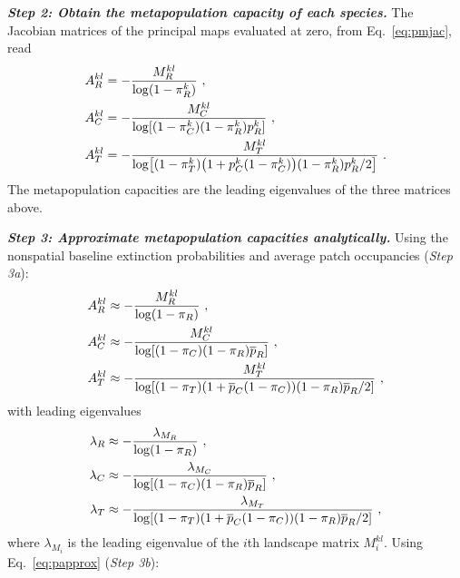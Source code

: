\documentclass[11pt]{article}
\newcommand{\ol}[1]{\overline{#1}}
\let\originalleft\left
\let\originalright\right
\renewcommand{\left}{\mathopen{}\mathclose\bgroup\originalleft}
\renewcommand{\right}{\aftergroup\egroup\originalright}
\begin{document}
\textit{\textbf{Step 2: Obtain the metapopulation capacity of each species.}}
The Jacobian matrices of the principal maps evaluated at zero, from Eq.~\ref{eq:pmjac}, read
\begin{align}
  \label{eq:BN_A_omniv_R}
  A_R^{kl} &= -\frac{M_R^{kl}}{\log(1 - \pi_R^k)} \ , \\
  \label{eq:BN_A_omniv_C}
  A_C^{kl} &= -\frac{M_C^{kl}}{\log[(1 - \pi_C^k) (1 - \pi_R^k) p_R^k]} \ , \\
  \label{eq:BN_A_omniv_T}
  A_T^{kl} &= -\frac{M_T^{kl}}{\log \left[ (1 - \pi_T^k) \left( 1 + p_C^k
             (1-\pi_C^k) \right) (1-\pi_R^k) p_R^k / 2 \right] } \ .
\end{align}
The metapopulation capacities are the leading eigenvalues of the three matrices above.

\textit{\textbf{Step 3: Approximate metapopulation capacities analytically.}}
Using the nonspatial baseline extinction probabilities and average patch occupancies (\textit{Step 3a}):
\begin{align}
  \label{eq:BN_A_omniv_R_nonspatial}
  A_R^{kl} &\approx -\frac{M_R^{kl}}{\log(1 - \pi_R)} \ , \\
  \label{eq:BN_A_omniv_C_nonspatial}
  A_C^{kl} &\approx -\frac{M_C^{kl}}{\log[(1 - \pi_C) (1-\pi_R)\ol{p}_R]} \ , \\
  \label{eq:BN_A_omniv_T_nonspatial}
  A_T^{kl} &\approx -\frac{M_T^{kl}}{\log \left[ (1 - \pi_T) \left( 1 + \ol{p}_C
             (1-\pi_C) \right) (1-\pi_R) \ol{p}_R / 2 \right] } \ ,
\end{align}
with leading eigenvalues
\begin{align}
  \label{eq:BN_lambda_omniv_R_nonspatial}
  \lambda_R &\approx -\frac{\lambda_{M_R}}{\log(1 - \pi_R)} \ , \\
  \label{eq:BN_lambda_omniv_C_nonspatial}
  \lambda_C &\approx -\frac{\lambda_{M_C}}{\log[(1 - \pi_C)
              (1-\pi_R)\ol{p}_R]} \ , \\
  \label{eq:BN_lambda_omniv_T_nonspatial}
  \lambda_T &\approx -\frac{\lambda_{M_T}}{\log \left[ (1 - \pi_T) \left( 1 +
              \ol{p}_C (1-\pi_C) \right) (1-\pi_R) \ol{p}_R / 2 \right] } \ , \\
\end{align}
where $\lambda_{M_i}$ is the leading eigenvalue of the $i$th landscape matrix $M_i^{kl}$. Using Eq.~\ref{eq:papprox} (\textit{Step 3b}):
\end{document}
